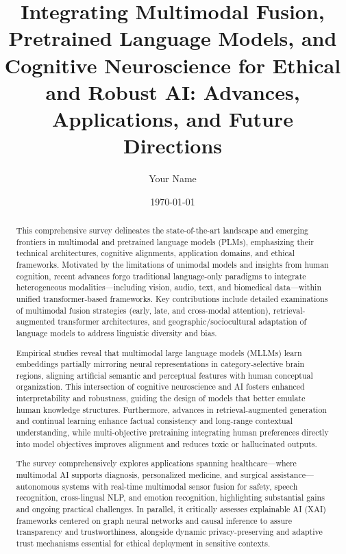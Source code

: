 \documentclass[11pt]{article}
\begin{document}
\author{Your Name}
\date{\today}

\title{\title{Integrating Multimodal Fusion, Pretrained Language Models, and Cognitive Neuroscience for Ethical and Robust AI: Advances, Applications, and Future Directions}}
\maketitle

\begin{abstract}
This comprehensive survey delineates the state-of-the-art landscape and emerging frontiers in multimodal and pretrained language models (PLMs), emphasizing their technical architectures, cognitive alignments, application domains, and ethical frameworks. Motivated by the limitations of unimodal models and insights from human cognition, recent advances forgo traditional language-only paradigms to integrate heterogeneous modalities—including vision, audio, text, and biomedical data—within unified transformer-based frameworks. Key contributions include detailed examinations of multimodal fusion strategies (early, late, and cross-modal attention), retrieval-augmented transformer architectures, and geographic/sociocultural adaptation of language models to address linguistic diversity and bias.

Empirical studies reveal that multimodal large language models (MLLMs) learn embeddings partially mirroring neural representations in category-selective brain regions, aligning artificial semantic and perceptual features with human conceptual organization. This intersection of cognitive neuroscience and AI fosters enhanced interpretability and robustness, guiding the design of models that better emulate human knowledge structures. Furthermore, advances in retrieval-augmented generation and continual learning enhance factual consistency and long-range contextual understanding, while multi-objective pretraining integrating human preferences directly into model objectives improves alignment and reduces toxic or hallucinated outputs.

The survey comprehensively explores applications spanning healthcare—where multimodal AI supports diagnosis, personalized medicine, and surgical assistance—autonomous systems with real-time multimodal sensor fusion for safety, speech recognition, cross-lingual NLP, and emotion recognition, highlighting substantial gains and ongoing practical challenges. In parallel, it critically assesses explainable AI (XAI) frameworks centered on graph neural networks and causal inference to assure transparency and trustworthiness, alongside dynamic privacy-preserving and adaptive trust mechanisms essential for ethical deployment in sensitive contexts.


\end{abstract}
\end{document}
